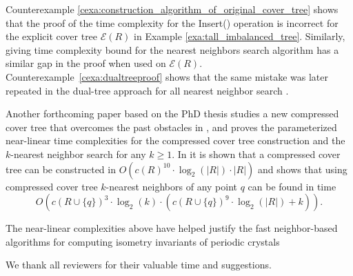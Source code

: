 \documentclass{vgtc}                          %
\numberwithin{algocf}{section}
\theoremstyle{definition}
\theoremstyle{definition}
\theoremstyle{definition}
\theoremstyle{plain}
\newcommand{\T}{\mathcal{E}}
\begin{document}
\noindent 
Counterexample \ref{cexa:construction_algorithm_of_original_cover_tree} shows that the proof of the time complexity \cite[Theorem~6]{beygelzimer2006cover} for the Insert() operation \cite[Algorithm~2]{beygelzimer2006cover} is incorrect for the explicit cover tree $\T(R)$ in Example \ref{exa:tall_imbalanced_tree}. 
Similarly, \cite[Theorem~5]{beygelzimer2006cover} giving time complexity bound for
the nearest neighbors search algorithm \cite[Algorithm~1]{beygelzimer2006cover} has a similar gap in the proof when used on $\T(R)$.
Counterexample~\ref{cexa:dualtreeproof} shows that the same mistake was later repeated in the dual-tree approach for all nearest neighbor search \cite[Theorem~3.1]{ram2009linear}.
\medskip

\noindent
Another forthcoming paper based on the PhD thesis \cite{2205.10194} studies a new compressed cover tree that overcomes the past obstacles in \cite[Theorem~5]{beygelzimer2006cover},  \cite[Theorem~6]{beygelzimer2006cover} and proves the parameterized near-linear time complexities for the compressed cover tree construction and the $k$-nearest neighbor search for any $k\geq 1$. In \cite[Corollary~3.5.11]{2205.10194} it is shown that a compressed cover tree can be constructed in $O(c(R)^{10} \cdot \log_2(|R|) \cdot |R|)$ and \cite[Theorem~3.7.14]{2205.10194} shows that using compressed cover tree $k$-nearest neighbors of any point $q$ can be found in time  $$O(c(R \cup \{q\})^3 \cdot \log_2(k) \cdot (c(R \cup \{q\})^9 \cdot \log_2(|R|) + k)).$$
\medskip

\noindent
The near-linear complexities above have helped justify the fast neighbor-based algorithms for computing isometry invariants of periodic crystals \cite{widdowson2022average,widdowson2021pointwise,anosova2021introduction,anosova2021isometry,anosova2022algorithms}
\medskip

\noindent
We thank all reviewers for their valuable time and suggestions.



\end{document}
